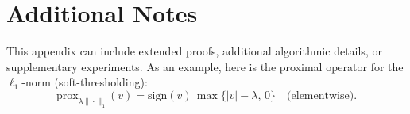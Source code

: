 \section{Additional Notes}
\label{sec:appendix}
This appendix can include extended proofs, additional algorithmic details, or supplementary experiments. As an example, here is the proximal operator for the $\ell_1$-norm (soft-thresholding):
\begin{equation}
  \mathrm{prox}_{\lambda \|\cdot\|_1}(v) = \mathrm{sign}(v)\,\max\{|v|-\lambda,\,0\} \quad \text{(elementwise)}.
\end{equation}
